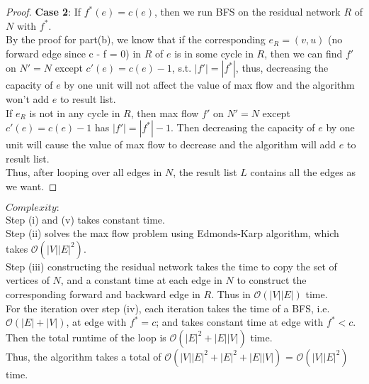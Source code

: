 \documentclass[11pt]{article}
\begin{document}
\begin{enumerate}
\begin{enumerate}
\begin{proof}
        \textbf{Case 2}: If $f^*(e) = c(e)$, then we run BFS on the residual network $R$ of $N$ with $f^*$. \\
        By the proof for part(b), we know that if the corresponding $e_R = (v, u)$ (no forward edge since c - f = 0) in $R$ of $e$ is in some cycle in $R$, then we can find $f'$ on $N' = N$ except $c'(e) = c(e) - 1$, s.t. $|f'| = |f^*|$, thus, decreasing the capacity of $e$ by one unit will not affect the value of max flow and the algorithm won't add $e$ to result list.\\
        If $e_R$ is not in any cycle in $R$, then max flow $f'$ on $N' = N$ except $c'(e) = c(e) - 1$ has $|f'| = |f^*| - 1$. Then decreasing the capacity of $e$ by one unit will cause the value of max flow to decrease and the algorithm will add $e$ to result list.\\
        Thus, after looping over all edges in $N$, the result list $L$ contains all the edges as we want.
    \end{proof}
    
    $Complexity: $\\
    Step (i) and (v) takes constant time.\\
    Step (ii) solves the max flow problem using Edmonds-Karp algorithm, which takes $\mathcal{O}(|V||E|^2)$. \\
    Step (iii) constructing the residual network takes the time to copy the set of vertices of $N$, and a constant time at each edge in $N$ to construct the corresponding forward and backward edge in $R$. Thus in $\mathcal{O}(|V||E|)$ time.\\
    For the iteration over step (iv), each iteration takes the time of a BFS, i.e. $\mathcal{O}(|E| + |V|)$, at edge with $f^* = c$; and takes constant time at edge with $f^* < c$. Then the total runtime of the loop is $\mathcal{O}(|E|^2 + |E||V|)$ time.\\
    Thus, the algorithm takes a total of $\mathcal{O}(|V||E|^2 + |E|^2 + |E||V|)$ = $\mathcal{O}(|V||E|^2)$ time.
    
 \end{enumerate}
\end{enumerate}
\end{document}
